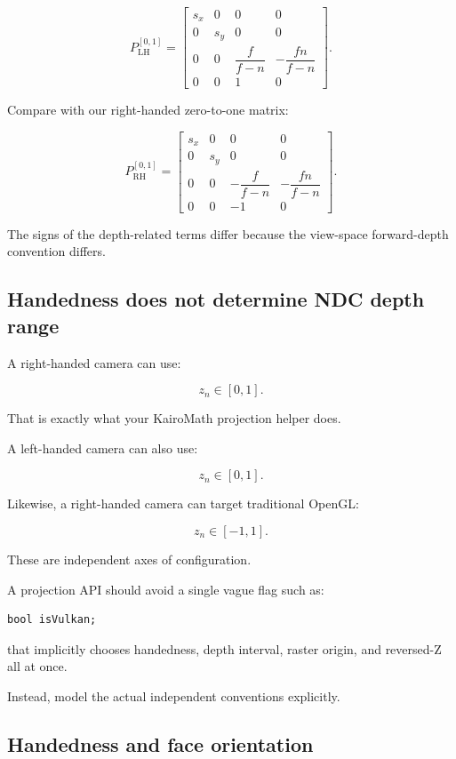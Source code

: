 \[
 \boxed{ P_{\mathrm{LH}}^{[0,1]}= \begin{bmatrix} s_x&0&0&0\\ 0&s_y&0&0\\ 0&0&\dfrac f{f-n}&-\dfrac{fn}{f-n}\\ 0&0&1&0 \end{bmatrix} }.
\]

Compare with our right-handed zero-to-one matrix:

\[
 P_{\mathrm{RH}}^{[0,1]}= \begin{bmatrix} s_x&0&0&0\\ 0&s_y&0&0\\ 0&0&-\dfrac f{f-n}&-\dfrac{fn}{f-n}\\ 0&0&-1&0 \end{bmatrix}.
\]

The signs of the depth-related terms differ because the view-space forward-depth convention differs.

\subsection{Handedness does not determine NDC depth range}\label{02-foundations-ii-ch033-handedness-does-not-determine-ndc-depth-range}

\hypertarget{02-foundations-ii-ch033-handedness-does-not-determine-ndc-depth-range}{}

A right-handed camera can use:

\[
 z_n\in[0,1].
\]

That is exactly what your KairoMath projection helper does.

A left-handed camera can also use:

\[
 z_n\in[0,1].
\]

Likewise, a right-handed camera can target traditional OpenGL:

\[
 z_n\in[-1,1].
\]

These are independent axes of configuration.

A projection API should avoid a single vague flag such as:

\begin{verbatim}
bool isVulkan;
\end{verbatim}

that implicitly chooses handedness, depth interval, raster origin, and reversed-Z all at once.

Instead, model the actual independent conventions explicitly.

\subsection{Handedness and face orientation}\label{02-foundations-ii-ch033-handedness-and-face-orientation}


